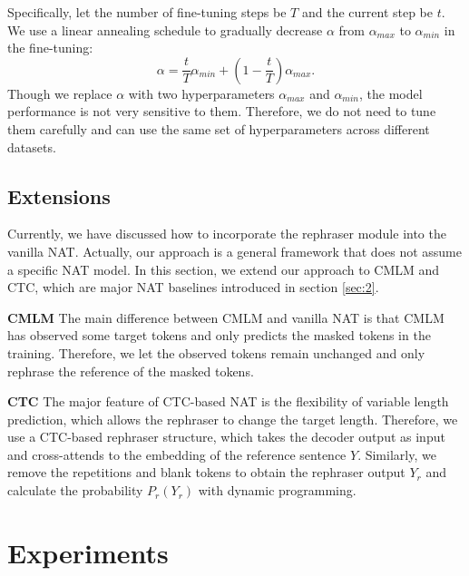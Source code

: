 \documentclass[letterpaper]{article} %
\begin{document}
Specifically, let the number of fine-tuning steps be $T$ and the current step be $t$. We use a linear annealing schedule to gradually decrease $\alpha$ from $\alpha_{max}$ to $\alpha_{min}$ in the fine-tuning:
\begin{equation}
\label{eq:alpha}
\alpha = \frac{t}{T}\alpha_{min}+(1-\frac{t}{T})\alpha_{max}.
\end{equation}
Though we replace $\alpha$ with two hyperparameters $\alpha_{max}$ and $\alpha_{min}$, the model performance is not very sensitive to them. Therefore, we do not need to tune them carefully and can use the same set of hyperparameters across different datasets.
\subsection{Extensions}
\label{sec:33}
Currently, we have discussed how to incorporate the rephraser module into the vanilla NAT. Actually, our approach is a general framework that does not assume a specific NAT model. In this section, we extend our approach to CMLM and CTC, which are major NAT baselines introduced in section \ref{sec:2}.

\noindent{}\textbf{CMLM} The main difference between CMLM and vanilla NAT is that CMLM has observed some target tokens and only predicts the masked tokens in the training. Therefore, we let the observed tokens remain unchanged and only rephrase the reference of the masked tokens.

\noindent{}\textbf{CTC} The major feature of CTC-based NAT is the flexibility of variable length prediction, which allows the rephraser to change the target length. Therefore, we use a CTC-based rephraser structure, which takes the decoder output as input and cross-attends to the embedding of the reference sentence $Y$. Similarly, we remove the repetitions and blank tokens to obtain the rephraser output $Y_r$ and calculate the probability $P_r(Y_r)$ with dynamic programming.

\section{Experiments}
\end{document}
